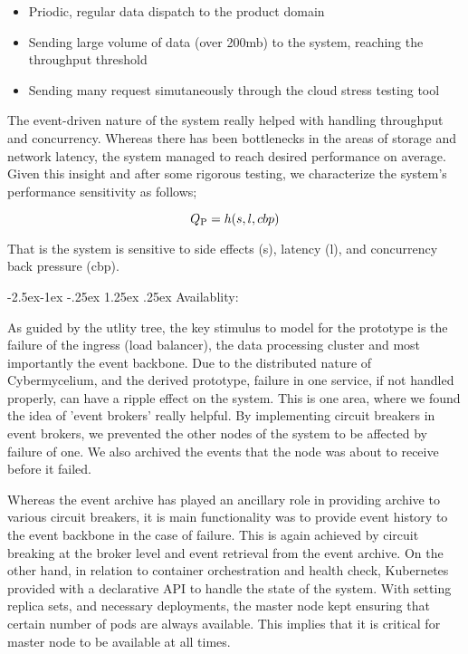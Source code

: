 \documentclass[review]{elsarticle}
\makeatletter
\renewcommand\paragraph{\@startsection{paragraph}{4}{\z@}%
            {-2.5ex\@plus -1ex \@minus -.25ex}%
            {1.25ex \@plus .25ex}%
            {\normalfont\normalsize\itshape}}
\makeatother
\begin{document}
\begin{itemize}
    \item Priodic, regular data dispatch to the product domain
    \item Sending large volume of data (over 200mb) to the system, reaching the throughput threshold
    \item Sending many request simutaneously through the cloud stress testing tool
\end{itemize}

The event-driven nature of the system really helped with handling throughput and concurrency. Whereas there has been bottlenecks in the areas of storage and network latency, the system managed to reach desired performance on average. Given this insight and after some rigorous testing, we characterize the system's performance sensitivity as follows;

\begin{equation}
    Q\textsubscript{P} = h(s, l, cbp)
\end{equation}

That is the system is sensitive to side effects (s), latency (l), and concurrency back pressure (cbp).

\paragraph{Availablity:}

As guided by the utlity tree, the key stimulus to model for the prototype is the failure of the ingress (load balancer), the data processing cluster and most importantly the event backbone. Due to the distributed nature of Cybermycelium, and the derived prototype, failure in one service, if not handled properly, can have a ripple effect on the system. This is one area, where we found the idea of 'event brokers' really helpful. By implementing circuit breakers in event brokers, we prevented the other nodes of the system to be affected by failure of one. We also archived the events that the node was about to receive before it failed.

Whereas the event archive has played an ancillary role in providing archive to various circuit breakers, it is main functionality was to provide event history to the event backbone in the case of failure. This is again achieved by circuit breaking at the broker level and event retrieval from the event archive. On the other hand, in relation to container orchestration and health check, Kubernetes provided with a declarative API to handle the state of the system. With setting replica sets, and necessary deployments, the master node kept ensuring that certain number of pods are always available. This implies that it is critical for master node to be available at all times.
\end{document}
